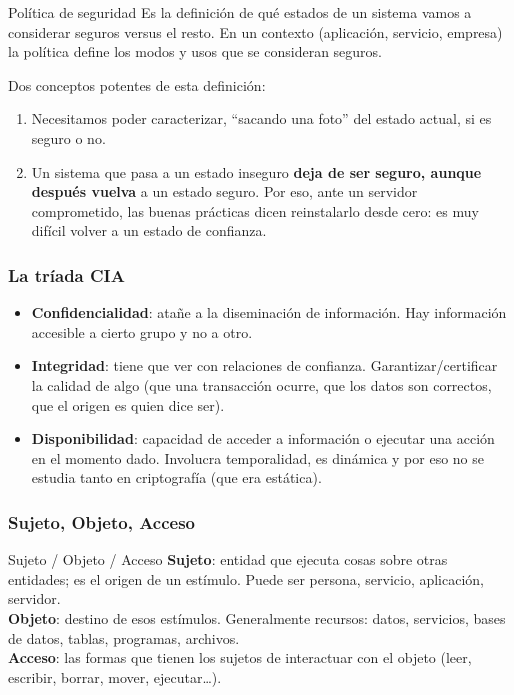 \documentclass[../main.tex]{subfiles}
\begin{document}
\begin{definicion}{Política de seguridad}
Es la definición de qué estados de un sistema vamos a considerar seguros versus el resto. En un contexto (aplicación, servicio, empresa) la política define los modos y usos que se consideran seguros.
\end{definicion}

Dos conceptos potentes de esta definición:
\begin{enumerate}[nosep]
  \item Necesitamos poder caracterizar, ``sacando una foto'' del estado actual, si es seguro o no.
  \item Un sistema que pasa a un estado inseguro \textbf{deja de ser seguro, aunque después vuelva} a un estado seguro. Por eso, ante un servidor comprometido, las buenas prácticas dicen reinstalarlo desde cero: es muy difícil volver a un estado de confianza.
\end{enumerate}

\subsubsection{La tríada CIA}

\begin{itemize}[nosep]
  \item \textbf{Confidencialidad}: atañe a la diseminación de información. Hay información accesible a cierto grupo y no a otro.
  \item \textbf{Integridad}: tiene que ver con relaciones de confianza. Garantizar/certificar la calidad de algo (que una transacción ocurre, que los datos son correctos, que el origen es quien dice ser).
  \item \textbf{Disponibilidad}: capacidad de acceder a información o ejecutar una acción en el momento dado. Involucra temporalidad, es dinámica y por eso no se estudia tanto en criptografía (que era estática).
\end{itemize}

\subsubsection{Sujeto, Objeto, Acceso}

\begin{definicion}{Sujeto / Objeto / Acceso}
\textbf{Sujeto}: entidad que ejecuta cosas sobre otras entidades; es el origen de un estímulo. Puede ser persona, servicio, aplicación, servidor.\\
\textbf{Objeto}: destino de esos estímulos. Generalmente recursos: datos, servicios, bases de datos, tablas, programas, archivos.\\
\textbf{Acceso}: las formas que tienen los sujetos de interactuar con el objeto (leer, escribir, borrar, mover, ejecutar\dots).
\end{definicion}
\end{document}
